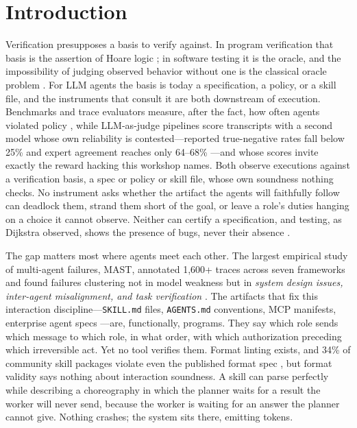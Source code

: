 \documentclass{article}
\begin{document}
\section{Introduction}\label{sec:intro}
Verification presupposes a basis to verify against. In program verification that basis is the assertion of Hoare logic \citep{hoare69}; in software testing it is the oracle, and the impossibility of judging observed behavior without one is the classical oracle problem \citep{barr15}. For LLM agents the basis is today a specification, a policy, or a skill file, and the instruments that consult it are both downstream of execution. Benchmarks and trace evaluators measure, after the fact, how often agents violated policy \citep{stweb,besafe}, while LLM-as-judge pipelines score transcripts with a second model whose own reliability is contested---reported true-negative rates fall below 25\% and expert agreement reaches only 64--68\% \citep{judgebias}---and whose scores invite exactly the reward hacking this workshop names. Both observe executions against a verification basis, a spec or policy or skill file, whose own soundness nothing checks. No instrument asks whether the artifact the agents will faithfully follow can deadlock them, strand them short of the goal, or leave a role's duties hanging on a choice it cannot observe. Neither can certify a specification, and testing, as Dijkstra observed, shows the presence of bugs, never their absence \citep{dijkstra72}.

The gap matters most where agents meet each other. The largest empirical study of multi-agent failures, MAST, annotated 1{,}600+ traces across seven frameworks and found failures clustering not in model weakness but in \emph{system design issues, inter-agent misalignment, and task verification} \citep{mast}. The artifacts that fix this interaction discipline---\texttt{SKILL.md} files, \texttt{AGENTS.md} conventions, MCP manifests, enterprise agent specs \citep{anthropic-skills}---are, functionally, programs. They say which role sends which message to which role, in what order, with which authorization preceding which irreversible act. Yet no tool verifies them. Format linting exists, and 34\% of community skill packages violate even the published format spec \citep{skilldex}, but format validity says nothing about interaction soundness. A skill can parse perfectly while describing a choreography in which the planner waits for a result the worker will never send, because the worker is waiting for an answer the planner cannot give. Nothing crashes; the system sits there, emitting tokens.
\end{document}
